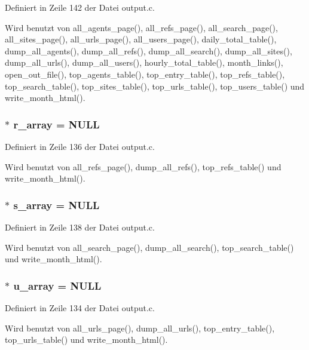 Definiert in Zeile 142 der Datei output.c.

Wird benutzt von all\_\-agents\_\-page(), all\_\-refs\_\-page(), all\_\-search\_\-page(), all\_\-sites\_\-page(), all\_\-urls\_\-page(), all\_\-users\_\-page(), daily\_\-total\_\-table(), dump\_\-all\_\-agents(), dump\_\-all\_\-refs(), dump\_\-all\_\-search(), dump\_\-all\_\-sites(), dump\_\-all\_\-urls(), dump\_\-all\_\-users(), hourly\_\-total\_\-table(), month\_\-links(), open\_\-out\_\-file(), top\_\-agents\_\-table(), top\_\-entry\_\-table(), top\_\-refs\_\-table(), top\_\-search\_\-table(), top\_\-sites\_\-table(), top\_\-urls\_\-table(), top\_\-users\_\-table() und write\_\-month\_\-html().
\subsubsection{$\ast$ {\bf r\_\-array} = NULL}\label{output_8c_d45469c4cb26a6ad02b3b2e95132bfd7}




Definiert in Zeile 136 der Datei output.c.

Wird benutzt von all\_\-refs\_\-page(), dump\_\-all\_\-refs(), top\_\-refs\_\-table() und write\_\-month\_\-html().
\subsubsection{$\ast$ {\bf s\_\-array} = NULL}\label{output_8c_9cc5723f216e0b1d0d8b497ca4117a40}




Definiert in Zeile 138 der Datei output.c.

Wird benutzt von all\_\-search\_\-page(), dump\_\-all\_\-search(), top\_\-search\_\-table() und write\_\-month\_\-html().
\subsubsection{$\ast$ {\bf u\_\-array} = NULL}\label{output_8c_4551dad9d68c34d932485aa2e47be6f4}




Definiert in Zeile 134 der Datei output.c.

Wird benutzt von all\_\-urls\_\-page(), dump\_\-all\_\-urls(), top\_\-entry\_\-table(), top\_\-urls\_\-table() und write\_\-month\_\-html().